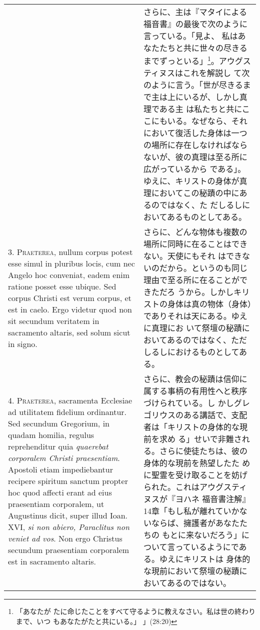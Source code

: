 \documentclass[10pt]{jsarticle} %
\begin{document}
\begin{longtable}{p{21em}p{21em}}
&

さらに、主は『マタイによる福音書』の最後で次のように言っている。「見よ、
 私はあなたたちと共に世々の尽きるまでずっといる」\footnote{「あなたが
 たに命じたことをすべて守るように教えなさい。私は世の終わりまで、いつ
 もあなたがたと共にいる。」 」(28:20)}。アウグスティヌスはこれを解説し
 て次のように言う。「世が尽きるまで主は上にいるが、しかし真理である主
 は私たちと共にここにもいる。なぜなら、それにおいて復活した身体は一つ
 の場所に存在しなければならないが、彼の真理は至る所に広がっているから
 である」。
 ゆえに、キリストの身体が真理においてこの秘蹟の中にあるのではなく、た
 だしるしにおいてあるものとしてある。


\\




3. {\scshape Praeterea}, nullum corpus potest esse simul in pluribus locis, cum nec
 Angelo hoc conveniat, eadem enim ratione posset esse ubique. Sed
 corpus Christi est verum corpus, et est in caelo. Ergo videtur quod
 non sit secundum veritatem in sacramento altaris, sed solum sicut in
 signo.


&


さらに、どんな物体も複数の場所に同時に在ることはできない。天使にもそれ
 はできないのだから。というのも同じ理由で至る所に在ることができただろ
 うから。しかしキリストの身体は真の物体（身体）でありそれは天にある。ゆえに真理にお
 いて祭壇の秘蹟においてあるのではなく、ただしるしにおけるものとしてあ
 る。

\\




4. {\scshape Praeterea}, sacramenta Ecclesiae ad utilitatem fidelium ordinantur. Sed
secundum Gregorium, in quadam homilia, regulus reprehenditur quia
{\itshape quaerebat corporalem Christi praesentiam}. Apostoli etiam impediebantur
recipere spiritum sanctum propter hoc quod affecti erant ad eius
praesentiam corporalem, ut Augustinus dicit, super illud Ioan. XVI, {\itshape si
non abiero, Paraclitus non veniet ad vos}. Non ergo Christus secundum
praesentiam corporalem est in sacramento altaris.

&

さらに、教会の秘蹟は信仰に属する事柄の有用性へと秩序づけられている。し
 かしグレゴリウスのある講話で、支配者は「キリストの身体的な現前を求め
 る」せいで非難される。さらに使徒たちは、彼の身体的な現前を熱望したた
 めに聖霊を受け取ることを妨げられた。これはアウグスティヌスが『ヨハネ
 福音書注解』14章「もし私が離れていかないならば、擁護者があなたたちの
 もとに来ないだろう」について言っているようにである。ゆえにキリストは
 身体的な現前において祭壇の秘蹟においてあるのではない。



\end{longtable}
\end{document}
